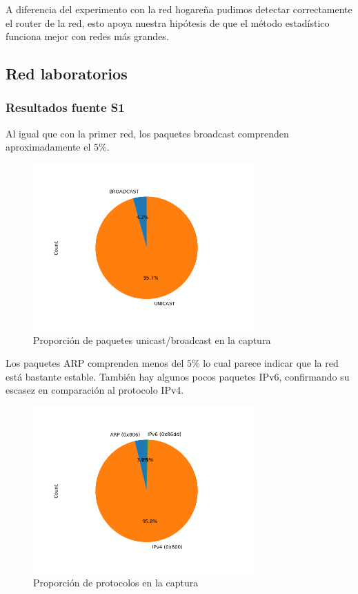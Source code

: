 A diferencia del experimento con la red hogareña pudimos detectar correctamente el router de la red, esto apoya nuestra hipótesis de que el método estadístico funciona mejor con redes más grandes.

\subsection*{Red laboratorios}


\subsubsection*{Resultados fuente S1}

Al igual que con la primer red, los paquetes broadcast comprenden aproximadamente el $5\%$.

\begin{figure}[H]
 \centering
 \includegraphics[width=8.5cm]{figs/broadcast_proportion_labo6_2018_04_18_S1_output.png}
 \caption{\normalfont Proporción de paquetes unicast/broadcast en la captura}
\end{figure}

Los paquetes ARP comprenden menos del $5\%$ lo cual parece indicar que la red está bastante estable. También hay algunos pocos paquetes IPv6, confirmando su escasez en comparación al protocolo IPv4.

\begin{figure}[H]
 \centering
 \includegraphics[width=8.5cm]{figs/protocols_proportion_labo6_2018_04_18_S1_output.png}
 \caption{\normalfont Proporción de protocolos en la captura}
\end{figure}

